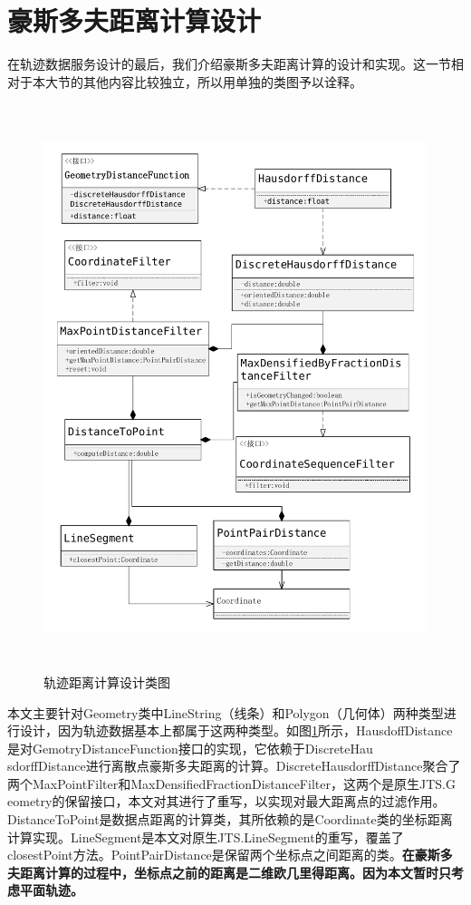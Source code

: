 \section{豪斯多夫距离计算设计}
在轨迹数据服务设计的最后，我们介绍豪斯多夫距离计算的设计和实现。这一节相对于本大节的其他内容比较独立，所以用单独的类图予以诠释。
\begin{figure}[H]
  \centering
  \includegraphics[width=6in,height=6.5in]{new_FIGs/chapter4/hausdoff-dis-class.pdf}
  \caption{轨迹距离计算设计类图}\label{trajectory-distance-compute-class}
\end{figure}
本文主要针对Geometry类中LineString（线条）和Polygon（几何体）两种类型进行设计，因为轨迹数据基本上都属于这两种类型。如图\ref{trajectory-distance-compute-class}所示，HausdoffDistance是对GemotryDistanceFunction接口的实现，它依赖于DiscreteHau \\ sdorffDistance进行离散点豪斯多夫距离的计算。DiscreteHausdorffDistance聚合了两个MaxPointFilter和MaxDensifiedFractionDistanceFilter，这两个是原生JTS.G\\eometry的保留接口，本文对其进行了重写，以实现对最大距离点的过滤作用。DistanceToPoint是数据点距离的计算类，其所依赖的是Coordinate类的坐标距离计算实现。LineSegment是本文对原生JTS.LineSegment的重写，覆盖了closestPoint方法。PointPairDistance是保留两个坐标点之间距离的类。\textbf{在豪斯多夫距离计算的过程中，坐标点之前的距离是二维欧几里得距离。因为本文暂时只考虑平面轨迹。}
